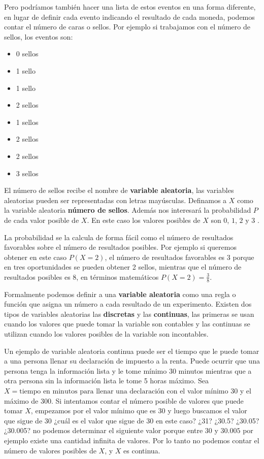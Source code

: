 \documentclass[
]{krantz}
\providecommand{\tightlist}{%
  \setlength{\itemsep}{0pt}\setlength{\parskip}{0pt}}
\begin{document}
Pero podríamos también hacer una lista de estos eventos en una forma diferente, en lugar de definir cada evento indicando el resultado de cada moneda, podemos contar el número de caras o sellos. Por ejemplo si trabajamos con el número de sellos, los eventos son:

\begin{itemize}
\tightlist
\item
  0 sellos
\item
  1 sello
\item
  1 sello
\item
  2 sellos
\item
  1 sellos
\item
  2 sellos
\item
  2 sellos
\item
  3 sellos
\end{itemize}

El número de sellos recibe el nombre de \textbf{variable aleatoria}, las variables aleatorias pueden ser representadas con letras mayúsculas. Definamos a \(X\) como la variable aleatoria \textbf{número de sellos}. Además nos interesará la probabilidad \(P\) de cada valor posible de \(X\). En este caso los valores posibles de \(X\) son \(0\), \(1\), \(2\) y \(3\) \citep{uboe2017}.

La probabilidad se la calcula de forma fácil como el número de resultados favorables sobre el número de resultados posibles. Por ejemplo si queremos obtener en este caso \(P\left(X =2 \right)\), el número de resultados favorables es \(3\) porque en tres oportunidades se pueden obtener 2 sellos, mientras que el número de resultados posibles es 8, en términos matemáticos \(P\left(X=2\right)= \frac{3}{8}\).

Formalmente podemos definir a una \textbf{variable aleatoria} como una regla o función que asigna un número a cada resultado de un experimento. Existen dos tipos de variables aleatorias las \textbf{discretas} y las \textbf{continuas}, las primeras se usan cuando los valores que puede tomar la variable son contables y las continuas se utilizan cuando los valores posibles de la variable son incontables.

Un ejemplo de variable aleatoria continua puede ser el tiempo que le puede tomar a una persona llenar su declaración de impuesto a la renta. Puede ocurrir que una persona tenga la información lista y le tome mínimo 30 minutos mientras que a otra persona sin la información lista le tome 5 horas máximo. Sea \(X= \text{tiempo en minutos para llenar una declaración}\) con el valor mínimo 30 y el máximo de 300. Si intentamos contar el número posible de valores que puede tomar \(X\), empezamos por el valor mínimo que es \(30\) y luego buscamos el valor que sigue de \(30\) ¿cuál es el valor que sigue de 30 en este caso? ¿31? ¿30.5? ¿30.05? ¿30.005? no podemos determinar el siguiente valor porque entre \(30\) y \(30.005\) por ejemplo existe una cantidad infinita de valores. Por lo tanto no podemos contar el número de valores posibles de \(X\), y \(X\) es continua.
\end{document}
